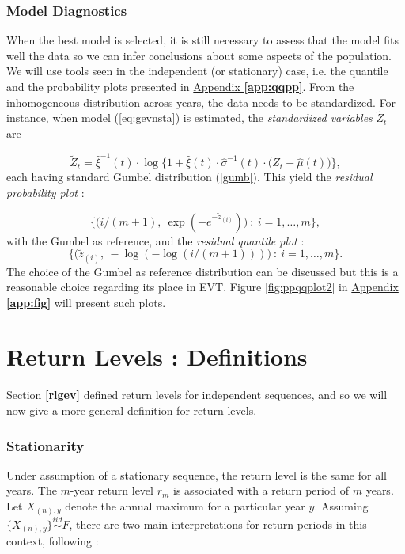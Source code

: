 \subsubsection*{Model Diagnostics}


When the best model is selected, it is still necessary to assess that the model fits well the data so we can infer conclusions about some aspects of the population. 
We will use tools seen in the independent (or stationary) case, i.e. the quantile and the probability plots presented in \hyperref[app:qqpp]{Appendix \textbf{\ref{app:qqpp}}}. From the inhomogeneous distribution across years, the data needs to be standardized. For instance, when model (\ref{eq:gevnsta}) is estimated, the \emph{standardized variables} $\tilde{Z}_t$ are 

\begin{equation}
\tilde{Z}_t=\hat{\xi}^{-1}(t)\cdot\log \bigg\{1+\hat{\xi}(t)\cdot \hat{\sigma}^{-1}(t)\cdot\Big(Z_t-\hat{\mu}(t)\Big)\bigg\},
\end{equation}
each having standard Gumbel distribution (\ref{gumb}). This yield the \emph{residual probability plot} :

\begin{equation}
\bigg\{\Big(i/(m+1),\  \exp(-e^{-\tilde{z}_{(i)}})\Big) \ : \ i=1,\dots,m\bigg\},
\end{equation}
with the Gumbel as reference, and the \emph{residual quantile plot} :
\begin{equation}
\bigg\{\Big(\tilde{z}_{(i)},\ -\log(-\log(i/(m+1)))\Big) \ : \ i=1,\dots,m\bigg\}.
\end{equation}
The choice of the Gumbel as reference distribution can be discussed but this is a reasonable choice regarding its place in EVT.
Figure \ref{fig:ppqqplot2} in \hyperref[app:fig]{Appendix \textbf{\ref{app:fig}}} will present such plots.


\section{Return Levels : Definitions}\label{sec:returnlvlnstatio}

\hyperref[rlgev]{Section  \textbf{\ref{rlgev}}} defined return levels for independent sequences, and so we will now give a more general definition for return levels. 

\subsubsection*{Stationarity} 
Under assumption of a
stationary sequence, the return level is the same for all years. The $m$-year return level $r_m$ is associated with a return period of $m$ years. Let $X_{(n),y}$ denote the annual maximum for a particular year $y$. Assuming $\{X_{(n),y}\}\stackrel{iid}{\sim}F$, there are two main interpretations for return periods in this context, following \citet[chap.4]{ag_extremes_2013} :

